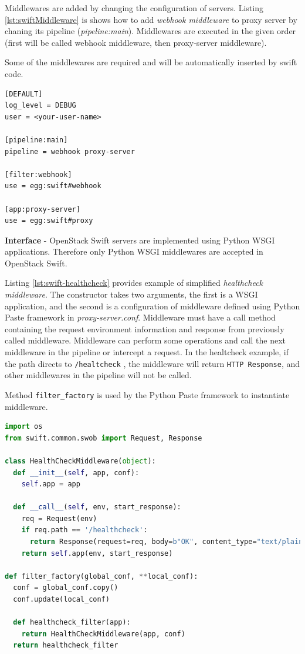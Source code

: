 \documentclass{ExcelAtFIT}
\begin{document}
Middlewares are added by changing the configuration of servers. Listing \ref{lst:swiftMiddleware} is shows how to add \textit{webhook middleware} to proxy server by chaning its pipeline (\textit{pipeline:main}). Middlewares are executed in the given order (first will be called webhook middleware, then proxy-server middleware).

Some of the middlewares are required and will be automatically inserted by swift code\cite{swiftMiddleware}.

\lstset{
		caption=Example of proxy server configuration (proxy-server.conf).,
		label=lst:swiftMiddleware
}
\begin{lstlisting}
[DEFAULT]
log_level = DEBUG
user = <your-user-name>

[pipeline:main]
pipeline = webhook proxy-server

[filter:webhook]
use = egg:swift#webhook

[app:proxy-server]
use = egg:swift#proxy
\end{lstlisting}

\textbf{Interface} - OpenStack Swift servers are implemented using Python WSGI applications. Therefore only Python WSGI middlewares are accepted in OpenStack Swift.

Listing \ref{lst:swift-healthcheck} provides example of simplified \textit{healthcheck middleware}. The constructor takes two arguments, the first is a WSGI application, and the second is a configuration of middleware defined using Python Paste framework in \textit{proxy-server.conf}. Middleware must have a call method containing the request environment information and response from previously called middleware. Middleware can perform some operations and call the next middleware in the pipeline or intercept a request. In the healtcheck example, if the path directs to \texttt{/healtcheck} , the middleware will return \texttt{HTTP Response}, and other middlewares in the pipeline will not be called.

Method \texttt{filter\_factory} is used by the Python Paste framework to instantiate middleware.

\begin{lstlisting}[language=Python, style=pythonStyle, caption=Example of healthcheck middleware in OpenStack Swift, label=lst:swift-healthcheck]
import os
from swift.common.swob import Request, Response

class HealthCheckMiddleware(object):
  def __init__(self, app, conf):
    self.app = app

  def __call__(self, env, start_response):
    req = Request(env)
    if req.path == '/healthcheck':
      return Response(request=req, body=b"OK", content_type="text/plain")(env, start_response)
    return self.app(env, start_response)

def filter_factory(global_conf, **local_conf):
  conf = global_conf.copy()
  conf.update(local_conf)

  def healthcheck_filter(app):
    return HealthCheckMiddleware(app, conf)
  return healthcheck_filter
\end{lstlisting}
\end{document}
